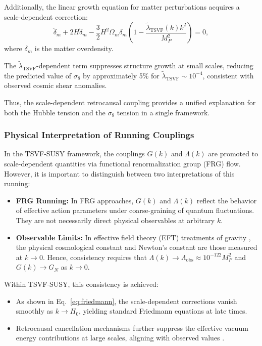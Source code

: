 \documentclass[twocolumn,superscriptaddress,floatfix]{revtex4-2}
\begin{document}
Additionally, the linear growth equation for matter perturbations acquires a scale-dependent correction:
\begin{equation}
\ddot{\delta}_m + 2H\dot{\delta}_m - \frac{3}{2}H^2\Omega_m \delta_m \left(1 - \frac{\tilde{\lambda}_{\text{TSVF}}(k) k^2}{M_P^2}\right) = 0,
\label{eq:growth}
\end{equation}
where \(\delta_m\) is the matter overdensity.

The \(\tilde{\lambda}_{\text{TSVF}}\)-dependent term suppresses structure growth at small scales, reducing the predicted value of \(\sigma_8\) by approximately 5\% for \(\tilde{\lambda}_{\text{TSVF}} \sim 10^{-4}\), consistent with observed cosmic shear anomalies.

Thus, the scale-dependent retrocausal coupling provides a unified explanation for both the Hubble tension and the \(\sigma_8\) tension in a single framework.

\subsubsection{Physical Interpretation of Running Couplings}
\label{subsec:running_g_lambda}

In the TSVF-SUSY framework, the couplings \(G(k)\) and \(\Lambda(k)\) are promoted to scale-dependent quantities via functional renormalization group (FRG) flow. However, it is important to distinguish between two interpretations of this running:

\begin{itemize}
    \item \textbf{FRG Running:} In FRG approaches, \(G(k)\) and \(\Lambda(k)\) reflect the behavior of effective action parameters under coarse-graining of quantum fluctuations. They are not necessarily direct physical observables at arbitrary \(k\).
    \item \textbf{Observable Limits:} In effective field theory (EFT) treatments of gravity \cite{Donoghue1994}, the physical cosmological constant and Newton's constant are those measured at \(k\to 0\). Hence, consistency requires that \(\Lambda(k) \to \Lambda_{\text{obs}} \approx 10^{-122}M_P^2\) and \(G(k) \to G_N\) as \(k \to 0\).
\end{itemize}

Within TSVF-SUSY, this consistency is achieved:
\begin{itemize}
    \item As shown in Eq.~\eqref{eq:friedmann}, the scale-dependent corrections vanish smoothly as \(k \to H_0\), yielding standard Friedmann equations at late times.
    \item Retrocausal cancellation mechanisms further suppress the effective vacuum energy contributions at large scales, aligning with observed values \cite{Padilla2015}.
\end{itemize}
\end{document}
